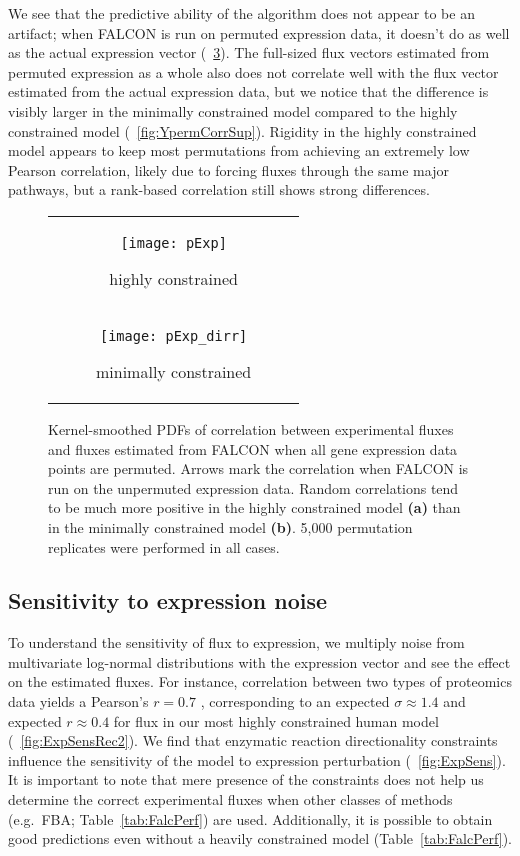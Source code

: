 We see that the predictive ability of the algorithm does not
appear to be an artifact; when FALCON is run on permuted expression data,
it doesn't do as well as the actual expression vector (\Fig~\ref{fig:YpermCorr}).
The full-sized flux vectors estimated from permuted expression as a
whole also does not correlate well with the flux vector estimated from
the actual expression data, but we notice that the difference is
visibly larger in the minimally constrained model compared to the
highly constrained model (\suppOrApp \Fig~\ref{fig:YpermCorrSup}). Rigidity in the
highly constrained model appears to keep most permutations from
achieving an extremely low Pearson correlation, likely due to forcing
fluxes through the same major pathways, but a rank-based correlation
still shows strong differences.
 
\begin{figure}
\centering
\begin{tabular}{c}
  \begin{subfigure}[b]{\textwidth}
  \texttt{[image: pExp]}
  \caption{highly constrained} \label{fig:YpermCorr:A}
  \end{subfigure}
\\
  \begin{subfigure}[b]{\textwidth}
  \texttt{[image: pExp\_dirr]}
  \caption{minimally constrained} \label{fig:YpermCorr:B}
  \end{subfigure} 
\\
\end{tabular}
\caption{Kernel-smoothed PDFs of correlation between experimental
fluxes and fluxes estimated from FALCON when all gene expression data
points are permuted. Arrows mark the correlation when FALCON is run on
the unpermuted expression data.  Random correlations tend to be much
more positive in the highly constrained model \textbf{(a)} than in the
minimally constrained model \textbf{(b)}. 5,000 permutation replicates
were performed in all cases.}
\label{fig:YpermCorr}
\end{figure}


\subsection{Sensitivity to expression noise}
\label{sec:sensToExpNoise}
To understand the sensitivity of flux to expression, we multiply noise
from multivariate log-normal distributions with the expression vector
and see the effect on the estimated fluxes. For instance, correlation
between two types of proteomics data yields a Pearson's $r = 0.7$
\citep{Gholami2013}, corresponding to an expected $\sigma \approx 1.4$
and expected $r \approx 0.4$ for flux in our most highly constrained
human model (\suppOrApp \Fig~\ref{fig:ExpSensRec2}). We find that
enzymatic reaction directionality constraints influence the
sensitivity of the model to expression perturbation
(\Fig~\ref{fig:ExpSens}). It is important to note that mere presence
of the constraints does not help us determine the correct experimental
fluxes when other classes of methods (e.g.\ FBA;
Table~\ref{tab:FalcPerf}) are used. Additionally, it is possible to
obtain good predictions even without a heavily constrained model
(Table~\ref{tab:FalcPerf}).

